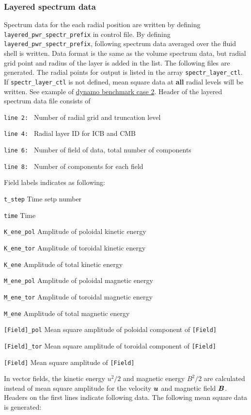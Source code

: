 \subsubsection{Layered spectrum data}
\label{section:layerd_spectr}
Spectrum data for the each radial position are written by defining {\tt layered\_pwr\_spectr\_prefix} in control file. By defining {\tt layered\_pwr\_spectr\_prefix}, following spectrum data averaged over the fluid shell is written. Data format is the same as the volume spectrum data, but radial grid point and radius of the layer is added in the list. The following files are generated. The radial points for output is listed in the array \verb|spectr_layer_ctl|. If \verb|spectr_layer_ctl| is not defined, mean square data at {\bf all} radial levels will be written. See example of \hyperref[section:dynamobench]{dynamo benchmark case 2}. Header of the layered spectrum data file consists of 
%
\begin{description}
\item{\tt  line 2: } Number of radial grid and truncation level
\item{\tt  line 4: } Radial layer ID for ICB and CMB
\item{\tt  line 6: } Number of field of data, total number of components
\item{\tt  line 8: } Number of components for each field
\end{description}
%
Field labels indicates as following:
%
\begin{description}
\item{\tt  t\_step}  Time setp number
\item{\tt  time}   Time
\item{\tt  K\_ene\_pol}  Amplitude of poloidal kinetic energy
\item{\tt  K\_ene\_tor}  Amplitude of toroidal kinetic energy
\item{\tt  K\_ene}       Amplitude of total kinetic energy
\item{\tt  M\_ene\_pol}  Amplitude of poloidal magnetic energy
\item{\tt  M\_ene\_tor}  Amplitude of toroidal magnetic energy
\item{\tt  M\_ene}       Amplitude of total magnetic energy
\item{\tt  [Field]\_pol} Mean square amplitude of poloidal component of {\tt [Field]}
\item{\tt  [Field]\_tor} Mean square amplitude of toroidal component of {\tt [Field]}
\item{\tt  [Field]}      Mean square amplitude of {\tt [Field]}
\end{description}
%
In vector fields, the kinetic energy $u^{2} / 2$ and magnetic energy $B^{2} / 2$ are calculated instead of mean square amplitude for the velocity $\mbox{\boldmath$u$}$ and magnetic field $\mbox{\boldmath$B$}$. Headers on the first lines indicate following data. The following mean square data is generated:

